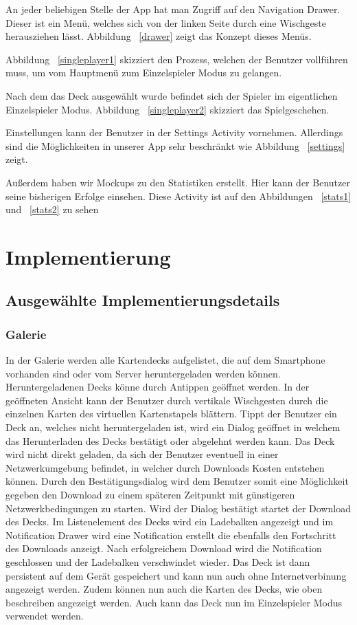\documentclass{scrartcl}
\begin{document}
An jeder beliebigen Stelle der App hat man Zugriff auf den Navigation Drawer.
Dieser ist ein Menü, welches sich von der linken Seite durch eine Wischgeste
herausziehen lässt. Abbildung ~\ref{drawer} zeigt das Konzept dieses Menüs.

Abbildung ~\ref{singleplayer1} skizziert den Prozess, welchen der Benutzer
vollführen muss, um vom Hauptmenü zum Einzelspieler Modus zu gelangen.

Nach dem das Deck ausgewählt wurde befindet sich der Spieler im eigentlichen
Einzelspieler Modus. Abbildung ~\ref{singleplayer2} skizziert das
Spielgeschehen.

Einstellungen kann der Benutzer in der Settings Activity vornehmen. Allerdings
sind die Möglichkeiten in unserer App sehr beschränkt wie Abbildung
~\ref{settings} zeigt.

Außerdem haben wir Mockups zu den Statistiken erstellt. Hier kann der Benutzer
seine bisherigen Erfolge einsehen. Diese Activity ist auf den Abbildungen
~\ref{stats1} und ~\ref{stats2} zu sehen


\clearpage

\section{Implementierung}
\subsection{Ausgewählte Implementierungsdetails}
\subsubsection{Galerie}

In der Galerie werden alle Kartendecks aufgelistet, die auf dem Smartphone
vorhanden sind oder vom Server heruntergeladen werden können. Heruntergeladenen
Decks könne durch Antippen geöffnet werden. In der geöffneten Ansicht kann der
Benutzer durch vertikale Wischgesten durch die einzelnen Karten des virtuellen
Kartenstapels blättern. Tippt der Benutzer ein Deck an, welches nicht
heruntergeladen ist, wird ein Dialog geöffnet in welchem das Herunterladen des
Decks bestätigt oder abgelehnt werden kann. Das Deck wird nicht direkt geladen,
da sich der Benutzer eventuell in einer Netzwerkumgebung befindet, in welcher
durch Downloads Kosten entstehen können. Durch den Bestätigungsdialog wird dem
Benutzer somit eine Möglichkeit gegeben den Download zu einem späteren Zeitpunkt
mit günstigeren Netzwerkbedingungen zu starten. Wird der Dialog bestätigt startet
der Download des Decks. Im Listenelement des Decks wird ein Ladebalken angezeigt
und im Notification Drawer wird eine Notification erstellt die ebenfalls den
Fortschritt des Downloads anzeigt. Nach erfolgreichem Download wird die
Notification geschlossen und der Ladebalken verschwindet wieder. Das Deck ist
dann persistent auf dem Gerät gespeichert und kann nun auch ohne
Internetverbinung angezeigt werden. Zudem können nun auch die Karten des Decks,
wie oben beschreiben angezeigt werden. Auch kann das Deck nun im Einzelspieler
Modus verwendet werden.
\end{document}
